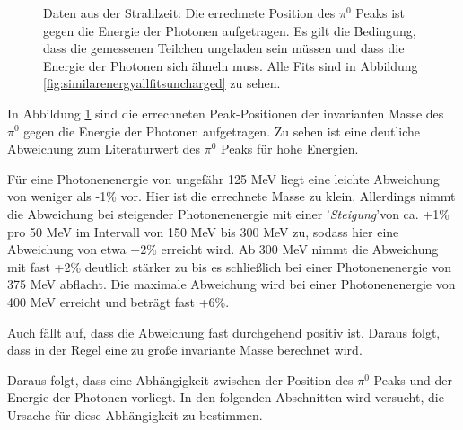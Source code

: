 \documentclass[a4paper,11pt,oneside,final,german,openbib,pdftex]{scrbook}
\begin{document}
{\begin{figure}[h!]
\begin{center}
 		\caption[Strahlzeit: Symmetrische Photonen; Abweichung]{Daten aus der Strahlzeit: Die errechnete Position des $\pi^0$ Peaks ist gegen die Energie der Photonen aufgetragen.
 			Es gilt die Bedingung, dass die gemessenen Teilchen ungeladen sein m\"ussen und dass die Energie der Photonen sich \"ahneln muss. Alle Fits sind in Abbildung \ref{fig:similarenergyallfitsuncharged} zu sehen.} 
 		\label{fig.Energydependency_pion}
 	\end{center}
 \end{figure}

In Abbildung \ref{fig.Energydependency_pion} sind die errechneten Peak-Positionen der invarianten Masse des $\pi^0$ gegen die Energie der Photonen aufgetragen. Zu sehen ist eine deutliche Abweichung zum Literaturwert des $\pi^0$ Peaks für hohe Energien. 

F\"ur eine Photonenenergie von ungef\"ahr 125 MeV liegt eine leichte Abweichung von weniger als -1\% vor. Hier ist die errechnete Masse zu klein. Allerdings nimmt die Abweichung bei steigender Photonenenergie mit einer '\textit{Steigung}'von ca. +1\% pro 50 MeV im Intervall von 150 MeV bis 300 MeV zu, sodass hier eine Abweichung von etwa +2\% erreicht wird. Ab 300 MeV nimmt die Abweichung mit fast +2\% deutlich st\"arker zu bis es schlie{\ss}lich bei einer Photonenenergie von 375 MeV abflacht. Die maximale Abweichung wird bei einer Photonenenergie von 400 MeV erreicht und betr\"agt fast +6\%.



Auch fällt auf, dass die Abweichung fast durchgehend positiv ist. Daraus folgt, dass in der Regel eine zu gro{\ss}e invariante Masse berechnet wird.
  
Daraus folgt, dass eine Abhängigkeit zwischen der Position des $\pi^0$-Peaks und der Energie der Photonen vorliegt. In den folgenden Abschnitten wird versucht, die Ursache für diese Abhängigkeit zu bestimmen.

}
\end{document}
